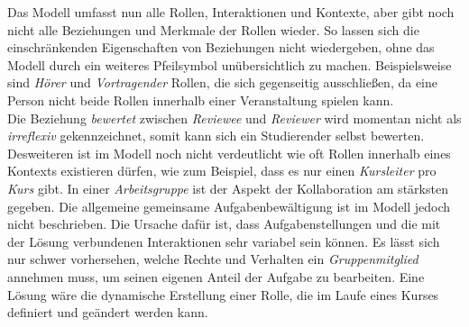 \documentclass[conference]{IEEEtran}
\begin{document}
Das Modell umfasst nun alle Rollen, Interaktionen und Kontexte, aber gibt noch nicht alle Beziehungen und Merkmale der Rollen wieder. So lassen sich die einschränkenden Eigenschaften von Beziehungen nicht wiedergeben, ohne das Modell durch ein weiteres Pfeilsymbol unübersichtlich zu machen. Beispielsweise sind \textit{Hörer} und \textit{Vortragender} Rollen, die sich gegenseitig ausschließen, da eine Person nicht beide Rollen innerhalb einer Veranstaltung spielen kann. \\Die Beziehung \textit{bewertet} zwischen \textit{Reviewee} und \textit{Reviewer} wird momentan nicht als \textit{irreflexiv} gekennzeichnet, somit kann sich ein Studierender selbst bewerten. Desweiteren ist im Modell noch nicht verdeutlicht wie oft Rollen innerhalb eines Kontexts existieren dürfen, wie zum Beispiel, dass es nur einen \textit{Kursleiter} pro \textit{Kurs} gibt. In einer \textit{Arbeitsgruppe} ist der Aspekt der Kollaboration am stärksten gegeben. Die allgemeine gemeinsame Aufgabenbewältigung ist im Modell jedoch nicht beschrieben. Die Ursache dafür ist, dass Aufgabenstellungen und die mit der Lösung verbundenen Interaktionen sehr variabel sein können. Es lässt sich nur schwer vorhersehen, welche Rechte und Verhalten ein \textit{Gruppenmitglied} annehmen muss, um seinen eigenen Anteil der Aufgabe zu bearbeiten. Eine Lösung wäre die dynamische Erstellung einer Rolle, die im Laufe eines Kurses definiert und geändert werden kann. 


\end{document}
